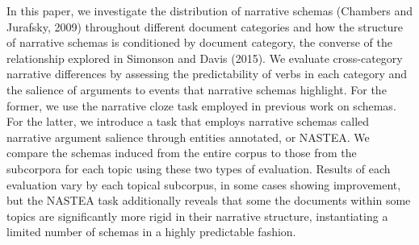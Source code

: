 In this paper, we investigate the distribution of narrative schemas (Chambers and Jurafsky, 2009) throughout different document categories and how the structure of narrative schemas is conditioned by document category, the converse of the relationship explored in Simonson and Davis (2015). We evaluate cross-category narrative differences by assessing the predictability of verbs in each category and the salience of arguments to events that narrative schemas highlight. For the former, we use the narrative cloze task employed in previous work on schemas. For the latter, we introduce a task that employs narrative schemas called narrative argument salience through entities annotated, or NASTEA. We compare the schemas induced from the entire corpus to those from the subcorpora for each topic using these two types of evaluation. Results of each evaluation vary by each topical subcorpus, in some cases showing improvement, but the NASTEA task additionally reveals that some the documents within some topics are significantly more rigid in their narrative structure, instantiating a limited number of schemas in a highly predictable fashion.
